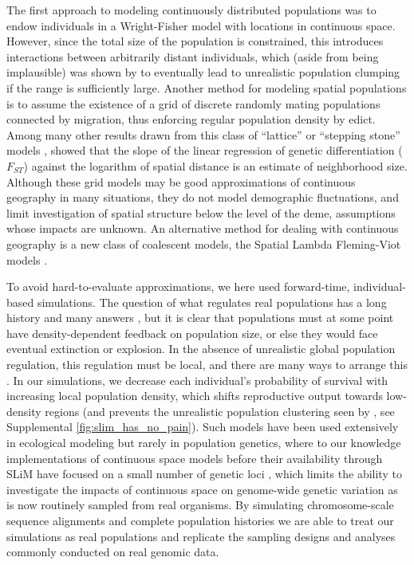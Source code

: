 \documentclass[10pt,twoside,lineno,hidelinks]{preprint}
\begin{document}
The first approach to modeling continuously distributed populations
was to endow individuals in a Wright-Fisher model with locations in continuous space.
However, since the total size of the population is constrained, this introduces interactions between arbitrarily distant individuals,
which (aside from being implausible) 
was shown by \citet{Felsenstein1975} to eventually lead to unrealistic population clumping
if the range is sufficiently large.
Another method for modeling spatial populations is to assume the existence of a grid of discrete randomly mating populations connected by migration, 
thus enforcing regular population density by edict.
Among many other results drawn from this class of ``lattice'' or ``stepping stone'' models
\citep{epperson2003geographical}, 
\citet{Rousset1997} showed that the slope of the linear regression of genetic differentiation ($F_{ST}$) against the logarithm of spatial distance is an estimate of neighborhood size. 
Although these grid models may be good approximations of continuous geography in many situations,
they do not model demographic fluctuations, and limit investigation of spatial structure below the level of the deme,
assumptions whose impacts are unknown. 
An alternative method for dealing with continuous geography is a new class of coalescent models,
the Spatial Lambda Fleming-Viot models \citep{Barton2010,Kelleher2014}.

To avoid hard-to-evaluate approximations, we here used forward-time, individual-based simulations.
The question of what regulates real populations has a long history and many answers
\citep[e.g.,][]{lloyd1967crowding,antonovics1980ecological,crawley1990population}, 
but it is clear that populations must at some point have density-dependent feedback on population size,
or else they would face eventual extinction or explosion.
In the absence of unrealistic global population regulation,
this regulation must be local,
and there are many ways to arrange this \citep{bolker2003spatial}.
In our simulations,
we decrease each individual's probability of survival with increasing local population density,
which shifts reproductive output towards low-density regions 
(and prevents the unrealistic population clustering seen by \citet{Felsenstein1975},
see Supplemental \autoref{fig:slim_has_no_pain}).
Such models have been used extensively in ecological modeling
\citep{durrett1994importance,bolker1997using,law2003population,fournier2004microscopic,champer2019suppression}
but rarely in population genetics, 
where to our knowledge implementations of continuous space models
before their availability through SLiM \citep{Haller2019}
have focused on a small number of genetic loci
\citep[e.g.,][]{slatkin1989comparison,barton2002neutral,robledoarnuncio2010isolation,rossine2014espao},
which limits the ability to investigate the impacts of continuous space on genome-wide genetic variation as is now routinely sampled from real organisms. 
By simulating chromosome-scale sequence alignments and complete population histories we are able to treat our simulations as real populations and replicate the sampling designs and analyses commonly conducted on real genomic data.
\end{document}
